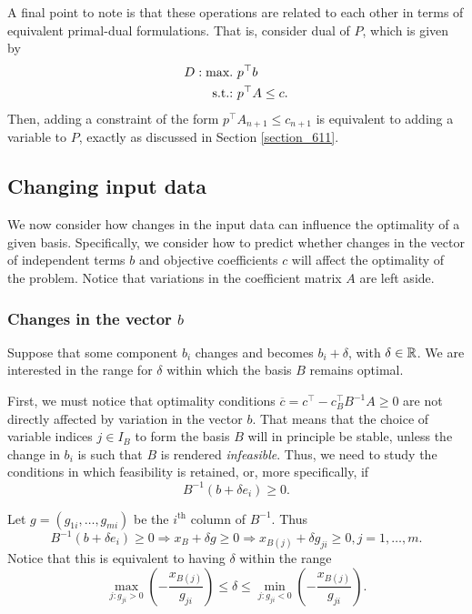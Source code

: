 A final point to note is that these operations are related to each other in terms of equivalent primal-dual formulations. That is, consider dual of $P$, which is given by
%
\begin{align*}
	D : \mathop{\text{max.~}}   & p^\top b \\
	\mathop{\text{s.t.:~}} 			& p^\top A \le c.
\end{align*}
%
Then, adding a constraint of the form $p^\top A_{n+1} \leq c_{n+1}$ is equivalent to adding a variable to $P$, exactly as discussed in Section \ref{section_611}.


\subsection{Changing input data} \label{section_613}

We now consider how changes in the input data can influence the optimality of a given basis. Specifically, we consider how to predict whether changes in the vector of independent terms $b$ and objective coefficients $c$ will affect the optimality of the problem. Notice that variations in the coefficient matrix $A$ are left aside.


\subsubsection{Changes in the vector $b$}

Suppose that some component $b_i$ changes and becomes $b_i + \delta$, with $\delta \in \mathbb{R}$. We are interested in the range for $\delta$ within which the basis $B$ remains optimal.

First, we must notice that optimality conditions $\overline{c} = c^\top - c^\top_B B^{-1}A \geq 0$ are not directly affected by variation in the vector $b$. That means that the choice of variable indices $j \in I_B$ to form the basis $B$ will in principle be stable, unless the change in $b_i$ is such that $B$ is rendered \emph{infeasible}. Thus, we need to study the conditions in which  feasibility is retained, or, more specifically, if 
%
\begin{equation*}
	B^{-1}(b + \delta e_i) \geq 0.	
\end{equation*}

Let $g = (g_{1i}, \dots, g_{mi})$ be the $i^\text{th}$ column of $B^{-1}$. Thus
%
\begin{equation*}
	B^{-1}(b + \delta e_i) \geq 0 \Rightarrow x_B + \delta g \geq 0 \Rightarrow x_{B(j)} + \delta g_{ji} \geq 0, j = 1,\dots, m.  
\end{equation*}
%
Notice that this is equivalent to having $\delta$ within the range
%
\begin{equation*}
	\max_{j : g_{ji} > 0}\left(-\frac{x_{B(j)}}{g_{ji}}\right) \leq \delta \leq \min_{j : g_{ji} < 0}\left(-\frac{x_{B(j)}}{g_{ji}}\right).	
\end{equation*}

